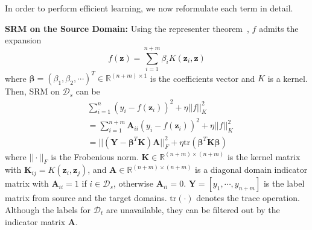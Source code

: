 \documentclass[sigconf]{acmart}
\begin{document}
In order to perform efficient learning, we now reformulate each term in detail.

\textbf{SRM on the Source Domain:} 
Using the representer theorem~\cite{belkin2006manifold}, $f$ admits the expansion 
\begin{equation}
	\label{equ-repr}
	f(\mathbf{z})=\sum_{i=1}^{n+m} \beta_i K(\mathbf{z}_i,\mathbf{z})
\end{equation}
where $\bm{\beta}=(\beta_1,\beta_2,\cdots)^T \in \mathbb{R}^{(n + m) \times 1}$ is the coefficients vector and $K$ is a kernel. Then, SRM on $\mathcal{D}_s$ can be
\begin{equation}
	\label{equ-risk2}
	\begin{split}
		&\sum_{i=1}^{n} (y_i - f(\mathbf{z}_i))^2 + \eta ||f||^2_K \\
		&= \sum_{i=1}^{n+m} \mathbf{A}_{ii}(y_i - f(\mathbf{z}_i))^2 + \eta ||f||^2_K\\
		&= ||(\mathbf{Y} - \bm{\beta}^T \mathbf{K}) \mathbf{A}||^2_{F} + \eta \mathrm{tr}(\bm{\beta}^T \mathbf{K} \bm{\beta})
	\end{split}	
\end{equation}
where $||\cdot||_F$ is the Frobenious norm. $\mathbf{K} \in \mathbb{R}^{(n+m) \times (n+m)}$ is the kernel matrix with $\mathbf{K}_{ij}=K(\mathbf{z}_i,\mathbf{z}_j)$, and $\mathbf{A} \in \mathbb{R}^{(n+m) \times (n+m)}$ is a diagonal domain indicator matrix with $\mathbf{A}_{ii}=1$ if $i \in \mathcal{D}_s$, otherwise $\mathbf{A}_{ii}=0$. $\mathbf{Y}=[y_1,\cdots,y_{n+m}]$ is the label matrix from source and the target domains. $\mathrm{tr(\cdot)}$ denotes the trace operation. Although the labels for $\mathcal{D}_t$ are unavailable, they can be filtered out by the indicator matrix $\mathbf{A}$.
\end{document}
